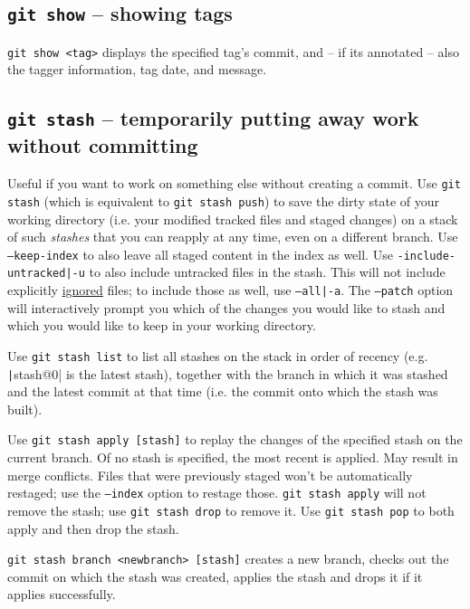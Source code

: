 \documentclass[table, xcdraw]{article}%
\begin{document}
\subsection{\texttt{git show} -- showing tags} \label{show}

\texttt{git show <tag>} displays the specified tag's commit, and -- if its annotated -- also the tagger information, tag date, and message.

\subsection{\texttt{git stash} -- temporarily putting away work without committing} \label{stash}

Useful if you want to work on something else without creating a commit. Use \texttt{git stash} (which is equivalent to \texttt{git stash push}) to save the dirty state of your working directory (i.e. your modified tracked files and staged changes) on a stack of such \emph{stashes} that you can reapply at any time, even on a different branch. Use \texttt{--keep-index} to also leave all staged content in the index as well. Use \texttt{-include-untracked|-u} to also include untracked files in the stash. This will not include explicitly \hyperref[gitignore]{ignored} files; to include those as well, use \texttt{--all|-a}. The \texttt{--patch} option will interactively prompt you which of the changes you would like to stash and which you would like to keep in your working directory.

Use \texttt{git stash list} to list all stashes on the stack in order of recency (e.g. \texttt|stash@{0}| is the latest stash), together with the branch in which it was stashed and the latest commit at that time (i.e. the commit onto which the stash was built).

Use \texttt{git stash apply [stash]} to replay the changes of the specified stash on the current branch. Of no stash is specified, the most recent is applied. May result in merge conflicts. Files that were previously staged won't be automatically restaged; use the \texttt{--index} option to restage those. \texttt{git stash apply} will not remove the stash; use \texttt{git stash drop} to remove it. Use \texttt{git stash pop} to both apply and then drop the stash.

\texttt{git stash branch <newbranch> [stash]} creates a new branch, checks out the commit on which the stash was created, applies the stash and drops it if it applies successfully.
\end{document}

